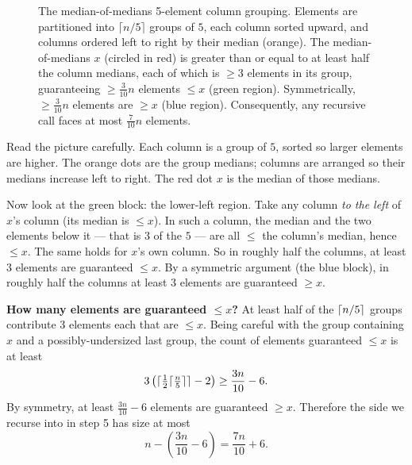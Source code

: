 \begin{figure}[H]
\caption{The median-of-medians 5-element column grouping. Elements are partitioned
into $\lceil n/5 \rceil$ groups of $5$, each column sorted upward, and columns ordered
left to right by their median (orange). The median-of-medians $x$ (circled in red) is
greater than or equal to at least half the column medians, each of which is $\ge 3$
elements in its group, guaranteeing $\ge \tfrac{3}{10}n$ elements $\le x$ (green region).
Symmetrically, $\ge \tfrac{3}{10}n$ elements are $\ge x$ (blue region). Consequently,
any recursive call faces at most $\tfrac{7}{10}n$ elements.}
\label{ch09:fig-mom}
\end{figure}

Read the picture carefully. Each column is a group of $5$, sorted so larger
elements are higher. The orange dots are the group medians; columns are arranged so
their medians increase left to right. The red dot $x$ is the median of those
medians.

Now look at the green block: the lower-left region. Take any column \emph{to the
left} of $x$'s column (its median is $\le x$). In such a column, the median and the
two elements below it --- that is $3$ of the $5$ --- are all $\le$ the column's
median, hence $\le x$. The same holds for $x$'s own column. So in roughly half the
columns, at least $3$ elements are guaranteed $\le x$. By a symmetric argument
(the blue block), in roughly half the columns at least $3$ elements are guaranteed
$\ge x$.

\begin{formalbox}
\textbf{How many elements are guaranteed $\le x$?} At least half of the
$\lceil n/5\rceil$ groups contribute $3$ elements each that are $\le x$. Being careful
with the group containing $x$ and a possibly-undersized last group, the count of
elements guaranteed $\le x$ is at least
\[
3\left(\lceil\tfrac{1}{2}\lceil\tfrac{n}{5}\rceil\rceil - 2\right) \ge \frac{3n}{10} - 6.
\]
By symmetry, at least $\tfrac{3n}{10} - 6$ elements are guaranteed $\ge x$.
Therefore the side we recurse into in step 5 has size at most
\[
n - \left(\frac{3n}{10} - 6\right) = \frac{7n}{10} + 6.
\]
\end{formalbox}

